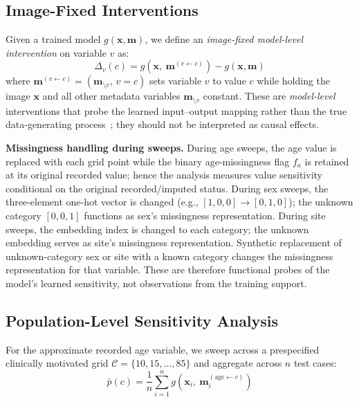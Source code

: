 \documentclass[12pt, a4paper]{article}
\begin{document}
\subsection{Image-Fixed Interventions}

Given a trained model $g(\mathbf{x}, \mathbf{m})$, we define an \emph{image-fixed model-level intervention} on variable $v$ as:
\begin{equation}
    \Delta_v(c) = g(\mathbf{x},\ \mathbf{m}^{(v \leftarrow c)}) - g(\mathbf{x}, \mathbf{m})
    \label{eq:intervention}
\end{equation}
where $\mathbf{m}^{(v \leftarrow c)} = (\mathbf{m}_{\setminus v},\, v{=}c)$ sets variable $v$ to value $c$ while holding the image $\mathbf{x}$ and all other metadata variables $\mathbf{m}_{\setminus v}$ constant. These are \emph{model-level} interventions that probe the learned input--output mapping rather than the true data-generating process~\citep{pearl2009causality}; they should not be interpreted as causal effects.

\noindent\textbf{Missingness handling during sweeps.} During age sweeps, the age value is replaced with each grid point while the binary age-missingness flag $f_a$ is retained at its original recorded value; hence the analysis measures value sensitivity conditional on the original recorded/imputed status. During sex sweeps, the three-element one-hot vector is changed (e.g., $[1,0,0] \to [0,1,0]$); the unknown category $[0,0,1]$ functions as sex's missingness representation. During site sweeps, the embedding index is changed to each category; the unknown embedding serves as site's missingness representation. Synthetic replacement of unknown-category sex or site with a known category changes the missingness representation for that variable. These are therefore functional probes of the model's learned sensitivity, not observations from the training support.

\subsection{Population-Level Sensitivity Analysis}

For the approximate recorded age variable, we sweep across a prespecified clinically motivated grid $\mathcal{C} = \{10, 15, \ldots, 85\}$ and aggregate across $n$ test cases:
\begin{equation}
    \bar{p}(c) = \frac{1}{n} \sum_{i=1}^{n} g(\mathbf{x}_i,\ \mathbf{m}_i^{(\text{age} \leftarrow c)})
    \label{eq:age_curve}
\end{equation}
\end{document}
